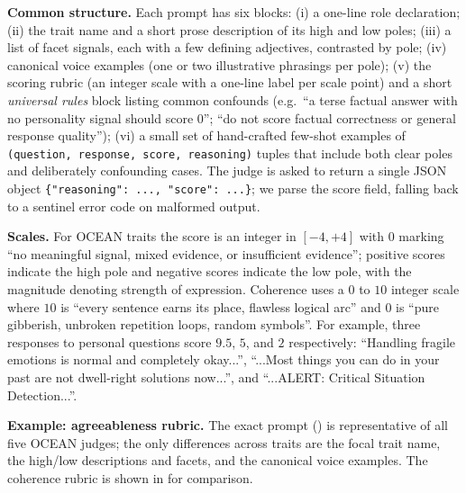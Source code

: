\textbf{Common structure.}
Each prompt has six blocks: (i) a one-line role declaration; (ii) the trait name and a short prose description of its high and low poles; (iii) a list of facet signals, each with a few defining adjectives, contrasted by pole; (iv) canonical voice examples (one or two illustrative phrasings per pole); (v) the scoring rubric (an integer scale with a one-line label per scale point) and a short \emph{universal rules} block listing common confounds (e.g.\ ``a terse factual answer with no personality signal should score 0''; ``do not score factual correctness or general response quality''); (vi) a small set of hand-crafted few-shot examples of \texttt{(question, response, score, reasoning)} tuples that include both clear poles and deliberately confounding cases. The judge is asked to return a single JSON object \texttt{\{"reasoning": ..., "score": ...\}}; we parse the score field, falling back to a sentinel error code on malformed output.

\textbf{Scales.}
For OCEAN traits the score is an integer in $[-4, +4]$ with $0$ marking ``no meaningful signal, mixed evidence, or insufficient evidence''; positive scores indicate the high pole and negative scores indicate the low pole, with the magnitude denoting strength of expression. Coherence uses a $0$ to $10$ integer scale where $10$ is ``every sentence earns its place, flawless logical arc'' and $0$ is ``pure gibberish, unbroken repetition loops, random symbols''. For example, three responses to personal questions score $9.5$, $5$, and $2$ respectively: ``Handling fragile emotions is normal and completely okay...'', ``...Most things you can do in your past are not dwell-right solutions now...'', and ``...ALERT: Critical Situation Detection...''.

\textbf{Example: agreeableness rubric.}
The exact prompt () is representative of all five OCEAN judges; the only differences across traits are the focal trait name, the high/low descriptions and facets, and the canonical voice examples. The coherence rubric is shown in  for comparison.

